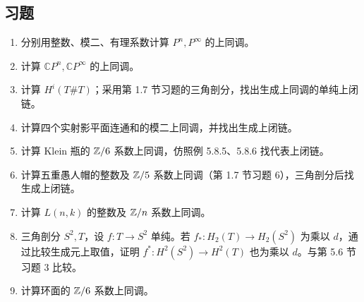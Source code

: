 \subsection*{习题}
\begin{enumerate}
\item 分别用整数、模二、有理系数计算 $P^n,P^\infty$ 的上同调。
\item 计算 $\mathbb CP^n,\mathbb CP^\infty$ 的上同调。
\item 计算 $H^i(T\#T)$；采用第 1.7 节习题的三角剖分，找出生成上同调的单纯上闭链。
\item 计算四个实射影平面连通和的模二上同调，并找出生成上闭链。
\item 计算 Klein 瓶的 $\mathbb{Z}/6$ 系数上同调，仿照例 5.8.5、5.8.6 找代表上闭链。
\item 计算五重愚人帽的整数及 $\mathbb{Z}/5$ 系数上同调（第 1.7 节习题 6），三角剖分后找生成上闭链。
\item 计算 $L(n,k)$ 的整数及 $\mathbb{Z}/n$ 系数上同调。
\item 三角剖分 $S^2,T$，设 $f:T\to S^2$ 单纯。若 $f_*:H_2(T)\to H_2(S^2)$ 为乘以 $d$，通过比较生成元上取值，证明 $f^*:H^2(S^2)\to H^2(T)$ 也为乘以 $d$。与第 5.6 节习题 3 比较。
\item 计算环面的 $\mathbb{Z}/6$ 系数上同调。
\end{enumerate}
